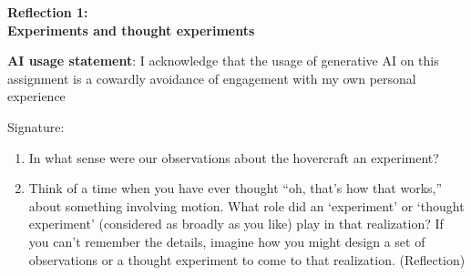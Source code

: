 \documentclass{article}
\begin{document}
\begin{center}
    \LARGE\bfseries
    Reflection 1:\\
    Experiments and thought experiments 
\end{center}
\textbf{AI usage statement}: I acknowledge that the usage of generative AI on this assignment is a cowardly avoidance of engagement with my own personal experience

\hspace*{\fill}Signature:\underline{\hspace{1.5in}}

\begin{enumerate}
    \item In what sense were our observations about the hovercraft an experiment?
    \vspace{1in}

    \item Think of a time when you have ever thought ``oh, that's how that works,'' about something involving motion. What role did an `experiment' or `thought experiment' (considered as broadly as you like) play in that realization? If you can't remember the details, imagine how you might design a set of observations or a thought experiment to come to that realization. (Reflection)
\end{enumerate}
\end{document}

